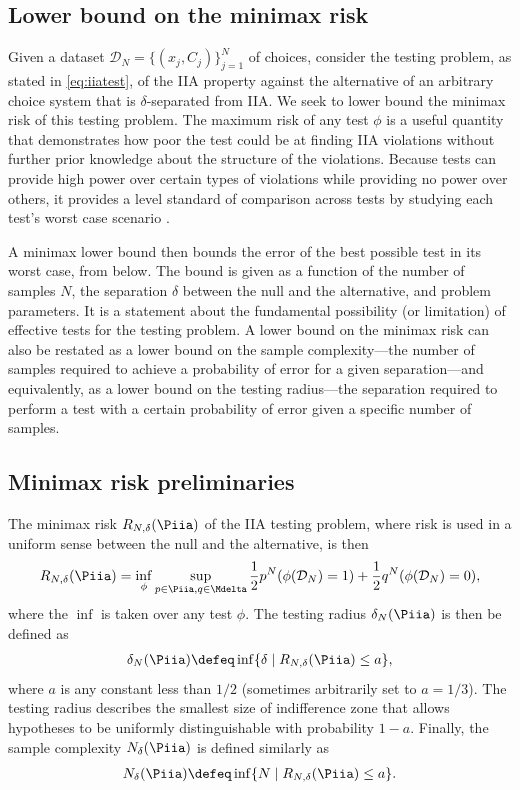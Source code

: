 \documentclass[10pt]{article}
\begin{document}
\begin{ReviewVerbatim}
	\section{Lower bound on the minimax risk}
	\label{sec:lowerbounds}

	Given a dataset $\mathcal D_N = \lbrace (x_j, C_j) \rbrace_{j=1}^N$ of choices, consider the testing problem, as stated in \eqref{eq:iiatest}, of the IIA property against the alternative of an arbitrary choice system that is $\delta$-separated from IIA. We seek to lower bound the minimax risk of this testing problem. The maximum risk of any test $\phi$ is a useful quantity that demonstrates how poor the test could be at finding IIA violations without further prior knowledge about the structure of the violations. Because tests can provide high power over certain types of violations while providing no power over others, it provides a level standard of comparison across tests by studying each test's worst case scenario \cite{balakrishnan2018hypothesis}.

	A minimax lower bound then bounds the error of the best possible test in its worst case, from below. The bound is given as a function of the number of samples $N$, the separation $\delta$ between the null and the alternative, and problem parameters. It is a statement about the fundamental possibility (or limitation) of effective tests for the testing problem. A lower bound on the minimax risk can also be restated as a lower bound on the sample complexity---the number of samples required to achieve a probability of error for a given separation---and equivalently, as a lower bound on the testing radius---the separation required to perform a test with a certain probability of error given a specific number of samples.

	\subsection{Minimax risk preliminaries}
	The minimax risk $R_{N,\delta}(\Piia)$ of the IIA testing problem, where risk is used in a uniform sense between the null and the alternative, is then
	\begin{align*}
	R_{N,\delta}(\Piia) = \inf_{\phi} \sup_{p \in \Piia, q \in \Mdelta} \frac{1}{2}p^N(\phi(\mathcal{D}_N) = 1) + \frac{1}{2}q^N(\phi(\mathcal{D}_N) = 0),
	\end{align*}
	where the $\inf$ is taken over any test $\phi$. The testing radius $\delta_N(\Piia)$ is then be defined as
	\begin{align*}
	\delta_N(\Piia) \defeq \inf \lbrace \delta \mid R_{N,\delta}(\Piia) \leq a \rbrace,
	\end{align*}
	where $a$ is any constant less than $1/2$ (sometimes arbitrarily set to $a=1/3$). The testing radius describes the smallest size of indifference zone that allows hypotheses to be uniformly distinguishable with probability $1-a$.
	Finally, the sample complexity $N_\delta(\Piia)$ is defined similarly as
	\begin{align*}
	N_\delta(\Piia) \defeq \inf \lbrace N \mid R_{N,\delta}(\Piia) \leq a \rbrace.
	\end{align*}


\end{ReviewVerbatim}
\end{document}
